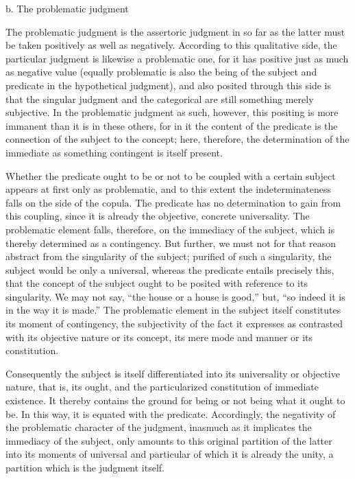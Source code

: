 b. The problematic judgment

The problematic judgment is the assertoric judgment
in so far as the latter must be taken
positively as well as negatively.
According to this qualitative side,
the particular judgment is likewise a problematic one,
for it has positive just as much as negative value
(equally problematic is also the
being of the subject and predicate in the hypothetical judgment),
and also posited through this side is
that the singular judgment and the categorical
are still something merely subjective.
In the problematic judgment as such, however,
this positing is more immanent than it is in these others,
for in it the content of the predicate is
the connection of the subject to the concept;
here, therefore, the determination of the immediate
as something contingent is itself present.

Whether the predicate ought to be
or not to be coupled with a certain subject
appears at first only as problematic,
and to this extent the indeterminateness
falls on the side of the copula.
The predicate has no determination
to gain from this coupling,
since it is already the objective, concrete universality.
The problematic element falls, therefore,
on the immediacy of the subject,
which is thereby determined as a contingency.
But further, we must not for that reason
abstract from the singularity of the subject;
purified of such a singularity,
the subject would be only a universal,
whereas the predicate entails precisely this,
that the concept of the subject ought to be posited
with reference to its singularity.
We may not say, “the house or a house is good,”
but, “so indeed it is in the way it is made.”
The problematic element in the subject itself
constitutes its moment of contingency,
the subjectivity of the fact it expresses
as contrasted with its objective nature or its concept,
its mere mode and manner or its constitution.

Consequently the subject is itself differentiated
into its universality or objective nature, that is, its ought,
and the particularized constitution of immediate existence.
It thereby contains the ground for being or not being
what it ought to be.
In this way, it is equated with the predicate.
Accordingly, the negativity of
the problematic character of the judgment,
inasmuch as it implicates the immediacy of the subject,
only amounts to this original partition of the latter
into its moments of universal and particular
of which it is already the unity,
a partition which is the judgment itself.

